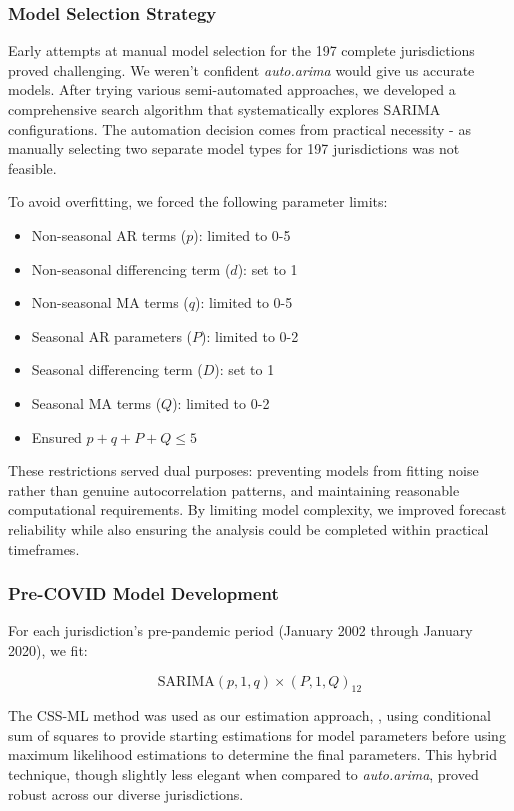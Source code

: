 \documentclass[11pt]{article}
\begin{document}
\subsubsection{Model Selection Strategy}

Early attempts at manual model selection for the 197 complete jurisdictions proved challenging. We weren't confident \textit{auto.arima} would give us accurate models. After trying various semi-automated approaches, we developed a comprehensive search algorithm that systematically explores SARIMA configurations. The automation decision comes from practical necessity - as manually selecting two separate model types for 197 jurisdictions was not feasible.


To avoid overfitting, we forced the following parameter limits:
\begin{itemize}
  \item Non-seasonal AR terms ($p$): limited to 0-5
  \item   Non-seasonal differencing term ($d$): set to 1
  \item Non-seasonal MA terms ($q$): limited to 0-5  
  \item Seasonal AR parameters ($P$): limited to 0-2
  \item   Seasonal differencing term ($D$): set to 1
  \item Seasonal MA terms ($Q$): limited to 0-2
  \item Ensured $p + q + P + Q \leq 5$
\end{itemize}

These restrictions served dual purposes: preventing models from fitting noise rather than genuine autocorrelation patterns, and maintaining reasonable computational requirements. By limiting model complexity, we improved forecast reliability while also ensuring the analysis could be completed within practical timeframes.

\subsubsection{Pre-COVID Model Development}

For each jurisdiction's pre-pandemic period (January 2002 through January 2020), we fit:

\begin{equation}
\text{SARIMA}(p,1,q) \times (P,1,Q)_{12}
\end{equation}

The CSS-ML  method  was used as our estimation approach, , using conditional sum of squares to provide starting estimations for model parameters before using maximum likelihood estimations to determine the final parameters. This hybrid technique, though slightly less elegant when compared to \textit{auto.arima}, proved robust across our diverse jurisdictions. 
\end{document}
